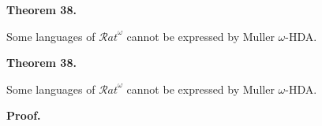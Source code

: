 \documentclass[10pt,a4paper]{article}
\begin{document}
 
 
\par\medskip\noindent\textbf{Theorem 38.}\par
 
 
Some languages of ${\mathcal{R}at}^{\omega}$ cannot be expressed by Muller $\omega$-HDA.\par
 
 
 

 
\par\medskip\noindent\textbf{Theorem 38.}\par
 
 
Some languages of ${\mathcal{R}at}^{\omega}$ cannot be expressed by Muller $\omega$-HDA.\par
 
 

 
 

 
\par\medskip\noindent\textbf{Proof.}\par
 
 
\end{document}

